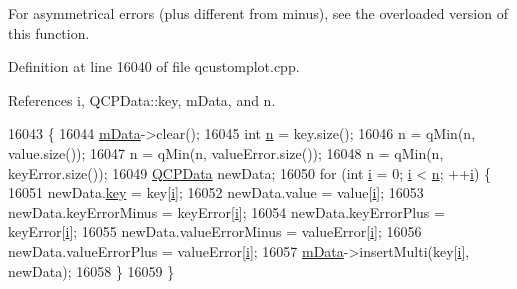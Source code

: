 For asymmetrical errors (plus different from minus), see the overloaded version of this function. 

Definition at line 16040 of file qcustomplot.\+cpp.



References i, Q\+C\+P\+Data\+::key, m\+Data, and n.


\begin{DoxyCode}
16043                                                                    \{
16044   \hyperlink{class_q_c_p_graph_a8457c840f69a0ac49f61d30a509c5d08}{mData}->clear();
16045   \textcolor{keywordtype}{int} \hyperlink{_comparision_pictures_2_createtest_image_8m_aeab71244afb687f16d8c4f5ee9d6ef0e}{n} = key.size();
16046   n = qMin(n, value.size());
16047   n = qMin(n, valueError.size());
16048   n = qMin(n, keyError.size());
16049   \hyperlink{class_q_c_p_data}{QCPData} newData;
16050   \textcolor{keywordflow}{for} (\textcolor{keywordtype}{int} \hyperlink{_comparision_pictures_2_createtest_image_8m_a6f6ccfcf58b31cb6412107d9d5281426}{i} = 0; \hyperlink{_comparision_pictures_2_createtest_image_8m_a6f6ccfcf58b31cb6412107d9d5281426}{i} < \hyperlink{_comparision_pictures_2_createtest_image_8m_aeab71244afb687f16d8c4f5ee9d6ef0e}{n}; ++\hyperlink{_comparision_pictures_2_createtest_image_8m_a6f6ccfcf58b31cb6412107d9d5281426}{i}) \{
16051     newData.\hyperlink{class_q_c_p_data_a2f5ba9aca61bb74f88516e148a4cf71b}{key} = key[\hyperlink{_comparision_pictures_2_createtest_image_8m_a6f6ccfcf58b31cb6412107d9d5281426}{i}];
16052     newData.value = value[\hyperlink{_comparision_pictures_2_createtest_image_8m_a6f6ccfcf58b31cb6412107d9d5281426}{i}];
16053     newData.keyErrorMinus = keyError[\hyperlink{_comparision_pictures_2_createtest_image_8m_a6f6ccfcf58b31cb6412107d9d5281426}{i}];
16054     newData.keyErrorPlus = keyError[\hyperlink{_comparision_pictures_2_createtest_image_8m_a6f6ccfcf58b31cb6412107d9d5281426}{i}];
16055     newData.valueErrorMinus = valueError[\hyperlink{_comparision_pictures_2_createtest_image_8m_a6f6ccfcf58b31cb6412107d9d5281426}{i}];
16056     newData.valueErrorPlus = valueError[\hyperlink{_comparision_pictures_2_createtest_image_8m_a6f6ccfcf58b31cb6412107d9d5281426}{i}];
16057     \hyperlink{class_q_c_p_graph_a8457c840f69a0ac49f61d30a509c5d08}{mData}->insertMulti(key[\hyperlink{_comparision_pictures_2_createtest_image_8m_a6f6ccfcf58b31cb6412107d9d5281426}{i}], newData);
16058   \}
16059 \}
\end{DoxyCode}
\hypertarget{class_q_c_p_graph_abb75736ecdbf6e6a7501e1da64fb18cf}{}
